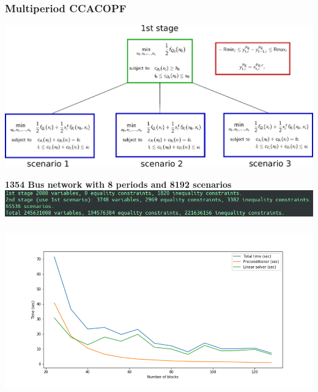 \begin{frame}
  \frametitle{Multiperiod CCACOPF}
  \begin{center}
    \includegraphics[width=\textwidth]{figures/twostageopt}
  \end{center}
  \begin{center}
  {\bf 1354 Bus network with 8 periods and 8192 scenarios}
    \includegraphics[width=\textwidth]{figures/generators}
  \end{center}
\end{frame}

\begin{frame}
  \frametitle{}
   \includegraphics[width=\textwidth]{figures/blocks}
\end{frame}


